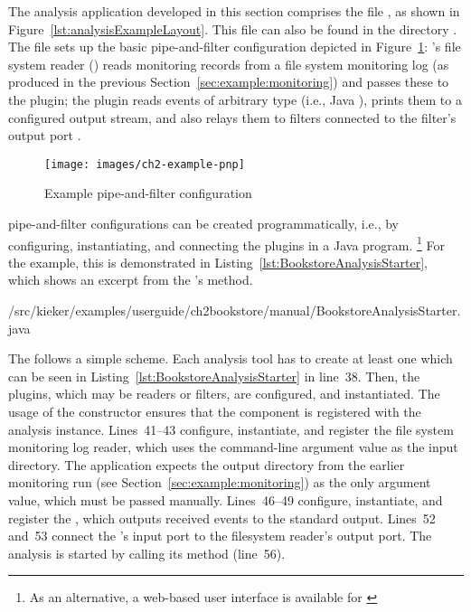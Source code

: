 \noindent The analysis application developed in this section comprises the file %
, as shown in Figure~\ref{lst:analysisExampleLayout}. %
This file can also be found in the directory \dir{\manualInstrumentedBookstoreApplicationReleaseDirDistro{}/}.
The file sets up the basic pipe-and-filter configuration depicted in Figure~\ref{fig:example:ch2:pipe-and-filter}: %
\Kieker{}'s file system reader () reads monitoring records %
from a file system monitoring log (as produced in the previous Section~\ref{sec:example:monitoring}) %
and passes these to the  plugin; the  plugin %
reads events of arbitrary type (i.e., Java ), prints them to a %
configured output stream, and also relays them to filters connected to the %
filter's output port . %

\begin{figure}[h]
\texttt{[image: images/ch2-example-pnp]}
\caption{Example pipe-and-filter configuration}
\label{fig:example:ch2:pipe-and-filter}
\end{figure}

\enlargethispage{0.5cm}

\KiekerAnalysisPart{} pipe-and-filter configurations can %
be created programmatically, i.e., by configuring, instantiating, and %
connecting the plugins in a Java program.%
\footnote{As an alternative, a web-based user interface is available for \Kieker{} \cite{KiekerWebSite}} %
For the example, this is demonstrated in Listing~\ref{lst:BookstoreAnalysisStarter}, %
which shows an excerpt from the 's  %
method. %


\setJavaCodeListing
%
{\manualInstrumentedBookstoreApplicationDir/src/kieker/examples/userguide/ch2bookstore/manual/BookstoreAnalysisStarter.java}


\noindent The  follows a simple scheme. Each %
analysis tool has to create at least one  which can be %
seen in Listing~\ref{lst:BookstoreAnalysisStarter} in line~38. Then, the plugins, %
which may be readers or filters, are configured, and instantiated. The usage of the  %
constructor ensures that the component is registered with the analysis instance. %
Lines~41--43 configure, instantiate, and register the file system monitoring %
log reader, which uses the command-line argument value as the input directory. %
The application expects the %
output directory from the earlier monitoring run (see Section~\ref{sec:example:monitoring}) %
as the only argument value, which must be passed manually. %
Lines~46--49 configure, instantiate, and register the , %
which outputs received events to the standard output. Lines~52 and~53 connect %
the 's input port to the filesystem reader's output port. %
The analysis is started by calling its  method (line~56). %


